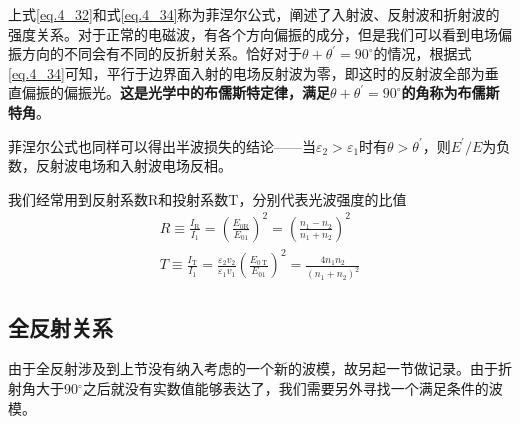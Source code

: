         \vspace*{2em}
        
        上式\ref{eq.4_32}和式\ref{eq.4_34}称为菲涅尔公式，阐述了入射波、反射波和折射波的强度关系。对于正常的电磁波，有各个方向偏振的成分，但是我们可以看到电场偏振方向的不同会有不同的反折射关系。恰好对于$\theta + \theta^{\prime}=90^\circ$的情况，根据式\ref{eq.4_34}可知，平行于边界面入射的电场反射波为零，即这时的反射波全部为垂直偏振的偏振光。\textbf{这是光学中的布儒斯特定律，满足$\theta + \theta^{\prime}=90^\circ$的角称为布儒斯特角}。

        菲涅尔公式也同样可以得出半波损失的结论——当$\varepsilon_2 > \varepsilon_1$时有$\theta > \theta^\prime$，则$E^\prime/E$为负数，反射波电场和入射波电场反相。

        我们经常用到反射系数R和投射系数T，分别代表光波强度的比值
        \begin{equation}
            \begin{gathered}
            R \equiv \frac{I_{\mathrm{R}}}{I_{1}}=\left(\frac{E_{0 \mathrm{R}}}{E_{01}}\right)^{2}=\left(\frac{n_{1}-n_{2}}{n_{1}+n_{2}}\right)^{2} \\
            T \equiv \frac{I_{\mathrm{T}}}{I_{1}}=\frac{\varepsilon_{2} v_{2}}{\varepsilon_{1} v_{1}}\left(\frac{E_{0 \mathrm{~T}}}{E_{01}}\right)^{2}=\frac{4 n_{1} n_{2}}{\left(n_{1}+n_{2}\right)^{2}}
            \end{gathered}
        \end{equation}

    \subsection{全反射关系}  
        由于全反射涉及到上节没有纳入考虑的一个新的波模，故另起一节做记录。由于折射角大于90$^\circ$之后就没有实数值能够表达了，我们需要另外寻找一个满足条件的波模。

